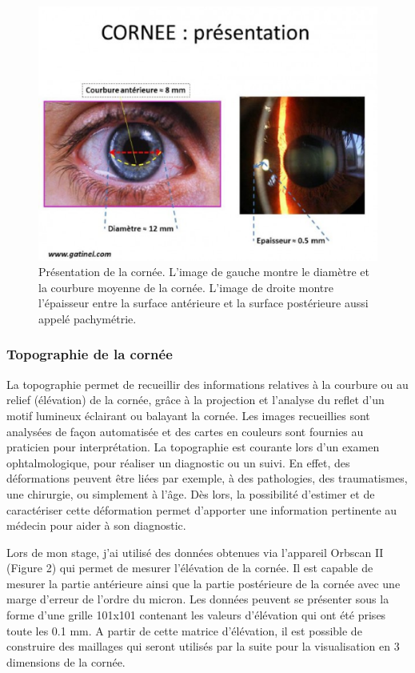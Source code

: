 \documentclass[a4paper,12pt]{article}
\begin{document}
\begin{figure}[h]
	\centering
	\includegraphics[width=15cm, trim=0cm 0cm 0cm 3cm, clip]{CorneePresentation.eps} 
	\caption{Présentation de la cornée. L'image de gauche montre le diamètre et la courbure moyenne de la cornée. L'image de droite montre l'épaisseur entre la surface antérieure et la surface postérieure aussi appelé pachymétrie.\cite{gatinel}}
\end{figure}


		\subsubsection{Topographie de la cornée}
La topographie permet de recueillir des informations relatives à la courbure ou au relief (élévation) de la cornée, grâce à la projection et l'analyse du reflet d'un motif lumineux éclairant ou balayant la cornée. Les images recueillies sont analysées de façon automatisée et des cartes en couleurs sont fournies au praticien pour interprétation. La topographie est courante lors d'un examen ophtalmologique, pour réaliser un diagnostic ou un suivi. En effet, des déformations peuvent être liées par exemple, à des pathologies, des traumatismes, une chirurgie, ou simplement à l'âge. Dès lors, la possibilité d'estimer et de caractériser cette déformation permet d'apporter une information pertinente au médecin pour aider à son diagnostic. \cite{gatinel, arnaud}

Lors de mon stage, j'ai utilisé des données obtenues via l'appareil Orbscan II (Figure 2) qui permet de mesurer l'élévation de la cornée. Il est capable de mesurer la partie antérieure ainsi que la partie postérieure de la cornée avec une marge d'erreur de l'ordre du micron. Les données peuvent se présenter sous la forme d'une grille 101x101 contenant les valeurs d'élévation qui ont été prises toute les 0.1 mm. A partir de cette matrice d'élévation, il est possible de construire des maillages qui seront utilisés par la suite pour la visualisation en 3 dimensions de la cornée. 
\end{document}
